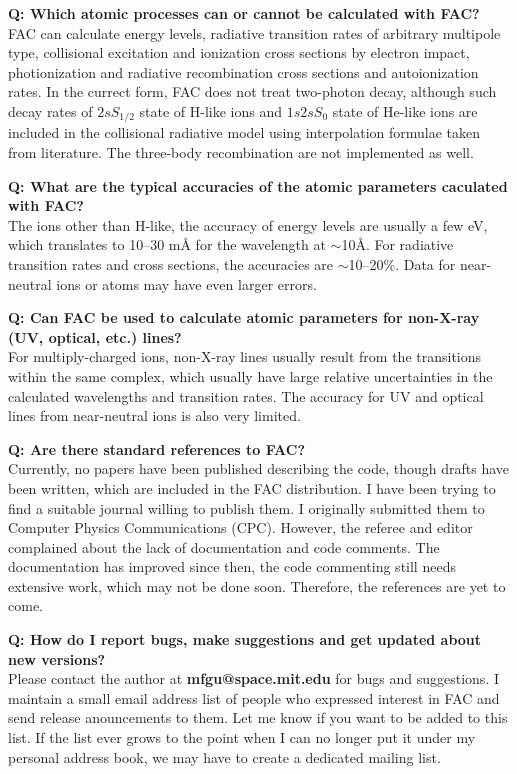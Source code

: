 \documentclass[twoside,letterpaper]{refrep}
\newcounter{faq}[section]
\newcommand{\faq}[2]{\stepcounter{faq}
	\begin{minipage}{\textwidth}
	\textbf{Q\arabic{faq}: #1?}\\#2
	\end{minipage}}
\begin{document}
\faq{Which atomic processes can or cannot be calculated with FAC}{
FAC can calculate energy levels, radiative transition rates of arbitrary
multipole type, collisional excitation and ionization cross sections by
electron impact, photionization and radiative recombination cross sections and
autoionization rates. In the currect form, FAC does not treat two-photon
decay, although such decay rates of $2s S_{1/2}$ state of H-like ions and
$1s2s S_{0}$ state of He-like ions are included in the collisional radiative
model using interpolation formulae taken from literature. The three-body
recombination are not implemented as well.}

\faq{What are the typical accuracies of the atomic parameters caculated with
FAC}{
The ions other than H-like, the accuracy of energy levels are usually a few
eV, which translates to 10--30 m{\AA} for the wavelength at $\sim$10{\AA}. For
radiative transition rates and cross sections, the accuracies are
$\sim$10--20\%. Data for near-neutral ions or atoms may have even larger
errors.}

\faq{Can FAC be used to calculate atomic parameters for non-X-ray (UV,
optical, etc.) lines}{
For multiply-charged ions, non-X-ray lines usually result from the transitions
within the same complex, which usually have large relative uncertainties in
the calculated wavelengths and transition rates. The accuracy for UV and
optical lines from near-neutral ions is also very limited.}

\faq{Are there standard references to FAC}{
Currently, no papers have been published describing the code, though
drafts have been written, which are included in the FAC distribution. I have
been trying to find a suitable journal willing to publish
them. I originally submitted them to Computer Physics Communications
(CPC). However, the referee and editor complained about the lack of
documentation and code comments. The documentation has improved since
then, the code commenting still needs extensive work, which may not be done
soon. Therefore, the references are yet to come.}

\faq{How do I report bugs, make suggestions and get updated about new
versions}{
Please contact the author at \textbf{mfgu@space.mit.edu} for bugs and
suggestions. I maintain a small email address list of people who expressed
interest in FAC and send release anouncements to them. Let me know if you want
to be added to this list. If the list ever grows to the point when I can no
longer put it under my personal address book, we may have to create a
dedicated mailing list.}
\end{document}
